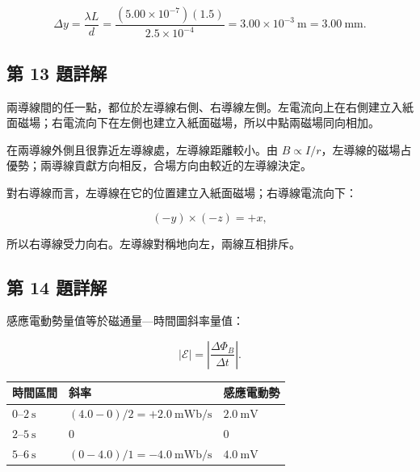 \documentclass[11pt,a4paper]{article}
\newcounter{none}
\begin{document}
\[
\Delta y
=\frac{\lambda L}{d}
=\frac{(5.00\times10^{-7})(1.5)}
{2.5\times10^{-4}}
=3.00\times10^{-3}\ \mathrm m
=3.00\ \mathrm{mm}.
\]

\subsection{第 13 題詳解}\label{ux7b2c-13-ux984cux8a73ux89e3}

兩導線間的任一點，都位於左導線右側、右導線左側。左電流向上在右側建立入紙面磁場；右電流向下在左側也建立入紙面磁場，所以中點兩磁場同向相加。

在兩導線外側且很靠近左導線處，左導線距離較小。由 \(B\propto I/r\)，左導線的磁場占優勢；兩導線貢獻方向相反，合場方向由較近的左導線決定。

對右導線而言，左導線在它的位置建立入紙面磁場；右導線電流向下：

\[
(-y)\times(-z)=+x,
\]

所以右導線受力向右。左導線對稱地向左，兩線互相排斥。

\subsection{第 14 題詳解}\label{ux7b2c-14-ux984cux8a73ux89e3}

感應電動勢量值等於磁通量---時間圖斜率量值：

\[
|\mathcal E|=\left|\frac{\Delta\Phi_B}{\Delta t}\right|.
\]

{\def\LTcaptype{none} %
\begin{longtable}[]{@{}
  >{\raggedright\arraybackslash}p{}
  >{\raggedleft\arraybackslash}p{}
  >{\raggedleft\arraybackslash}p{}@{}}
\toprule\noalign{}
\begin{minipage}[b]{\linewidth}\raggedright
時間區間
\end{minipage} & \begin{minipage}[b]{\linewidth}\raggedleft
斜率
\end{minipage} & \begin{minipage}[b]{\linewidth}\raggedleft
感應電動勢
\end{minipage} \\
\midrule\noalign{}
\endhead
\bottomrule\noalign{}
\endlastfoot
\(0\)--\(2\ \mathrm s\) & \((4.0-0)/2=+2.0\ \mathrm{mWb/s}\) & \(2.0\ \mathrm{mV}\) \\
\(2\)--\(5\ \mathrm s\) & \(0\) & \(0\) \\
\(5\)--\(6\ \mathrm s\) & \((0-4.0)/1=-4.0\ \mathrm{mWb/s}\) & \(4.0\ \mathrm{mV}\) \\
\end{longtable}
}
\end{document}
